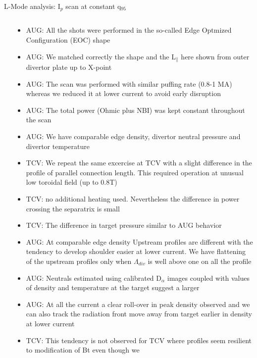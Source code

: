 \documentclass[10pt, compress]{beamer}
\begin{document}
\begin{frame}{L-Mode analysis: I$_p$ scan at constant q$_{95}$}
\begin{columns}
\begin{column}{0.65\textwidth}
  \end{column}
  \begin{column}{0.35\textwidth}
    \begin{itemize}
      \item<1|only@1> AUG: All the shots were performed in the so-called
        Edge Optmized Configuration (EOC) shape
      \item<1|only@1> AUG: We matched correctly the shape and the L$_{\parallel}$
        here shown from outer divertor plate up to X-point 
      \item<2|only@2> AUG: The scan was performed with similar puffing rate (0.8-1
        MA) whereas we reduced it at lower current to avoid early
        disruption
      \item<2|only@2> AUG: The total power (Ohmic plus NBI) was kept
        constant throughout the scan
      \item<2|only@2> AUG: We have comparable edge density, divertor neutral
        pressure and divertor temperature
      \item<3|only@3> TCV: We repeat the same excercise at TCV with a
        slight difference in the profile of parallel connection
        length. This required operation at unusual low toroidal field
        (up to 0.8T)
      \item<4|only@4> TCV: no additional heating
        used. Nevertheless the difference in power crossing the separatrix
        is small
      \item<4|only@4> TCV: The difference in target pressure similar
        to AUG behavior
      \item<5|only@5> AUG: At comparable edge density Upstream profiles are
        different with the tendency to develop shoulder easier at
        lower current. \alert{We have flattening of the upstream
          profiles only when $\Lambda_{div}$ is well above one on all
          the profile}
      \item<6|only@6> AUG: Neutrals estimated using calibrated D$_{\alpha}$
        images coupled with values of density and temperature at the
        target suggest a larger   
      \item<7|only@7> AUG: At all the current a clear roll-over in
        peak density observed and we can also track the radiation
        front move away from target earlier in density at lower current
      \item<8|only@8> TCV: This tendency is not observed for TCV where
        profiles seem resilient to modification of Bt even though we

\end{itemize}
\end{column}
\end{columns}
\end{frame}
\end{document}
